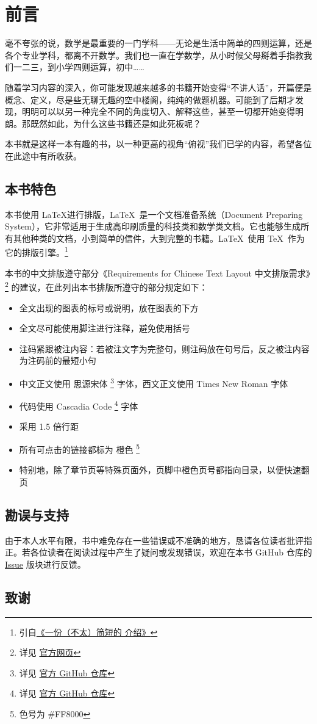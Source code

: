 \chapter{前言}

毫不夸张的说，数学是最重要的一门学科——无论是生活中简单的四则运算，还是各个专业学科，都离不开数学。我们也一直在学数学，从小时候父母掰着手指教我们一二三，到小学四则运算，初中……

随着学习内容的深入，你可能发现越来越多的书籍开始变得“不讲人话”，开篇便是概念、定义，尽是些无聊无趣的空中楼阁，纯纯的做题机器。可能到了后期才发现，明明可以以另一种完全不同的角度切入、解释这些，甚至一切都开始变得明朗。那既然如此，为什么这些书籍还是如此死板呢？

本书就是这样一本有趣的书，以一种更高的视角“俯视”我们已学的内容，希望各位在此途中有所收获。

\section*{本书特色}

本书使用 \LaTeX 进行排版，\LaTeX\ 是一个文档准备系统（Document Preparing System），它非常适用于生成高印刷质量的科技类和数学类文档。它也能够生成所有其他种类的文档，小到简单的信件，大到完整的书籍。\LaTeX\ 使用 \TeX\ 作为它的排版引擎。\footnote{引自\href{https://github.com/CTeX-org/lshort-zh-cn/}{《一份（不太）简短的 \LaTeXe 介绍》}}

本书的中文排版遵守部分《Requirements for Chinese Text Layout 中文排版需求》\footnote{详见 \href{https://w3c.github.io/clreq}{官方网页}} 的建议，在此列出本书排版所遵守的部分规定如下：

\begin{itemize}
  \item 全文出现的图表的标号或说明，放在图表的下方
  \item 全文尽可能使用脚注进行注释，避免使用括号
  \item 注码紧跟被注内容：若被注文字为完整句，则注码放在句号后，反之被注内容为注码前的最短小句
  \item 中文正文使用 思源宋体 \footnote{详见 \href{https://github.com/adobe-fonts/source-han-serif}{官方 GitHub 仓库}} 字体，西文正文使用 Times New Roman 字体
  \item 代码使用 Cascadia Code \footnote{详见 \href{https://github.com/microsoft/cascadia-code}{官方 GitHub 仓库}} 字体
  \item 采用 1.5 倍行距
  \item 所有可点击的链接都标为 {\color{orange} 橙色} \footnote{色号为 \#FF8000}
  \item 特别地，除了章节页等特殊页面外，页脚中橙色页号都指向目录，以便快速翻页
\end{itemize}

\section*{勘误与支持}

由于本人水平有限，书中难免存在一些错误或不准确的地方，恳请各位读者批评指正。若各位读者在阅读过程中产生了疑问或发现错误，欢迎在本书 GitHub 仓库的 \href{https://github.com/Cierra-Runis/math/issues}{Issue} 版块进行反馈。

\section*{致谢}
